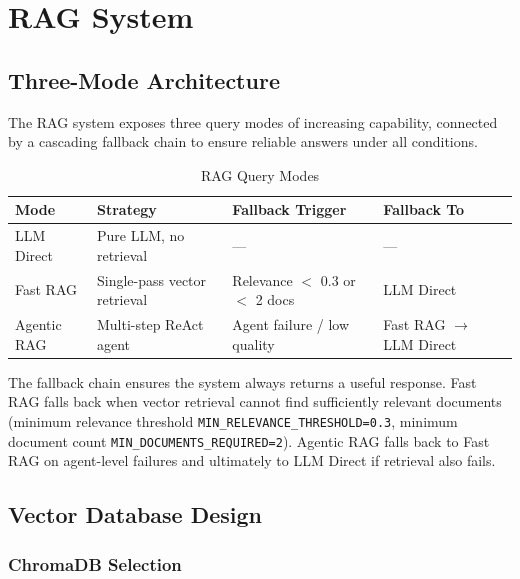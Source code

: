 \section{RAG System}
\label{sec:rag}

\subsection{Three-Mode Architecture}

The RAG system exposes three query modes of increasing capability, connected by a cascading fallback chain to ensure reliable answers under all conditions.

\begin{table}[H]
    \centering
    \caption{RAG Query Modes}
    \begin{tabular}{@{}p{2.5cm}p{4cm}p{4cm}p{2.5cm}@{}}
        \toprule
        \textbf{Mode} & \textbf{Strategy} & \textbf{Fallback Trigger} & \textbf{Fallback To} \\ \midrule
        LLM Direct   & Pure LLM, no retrieval          & ---                              & --- \\
        Fast RAG     & Single-pass vector retrieval    & Relevance $<$ 0.3 or $<$ 2 docs & LLM Direct \\
        Agentic RAG  & Multi-step ReAct agent          & Agent failure / low quality    & Fast RAG $\to$ LLM Direct \\ \bottomrule
    \end{tabular}
\end{table}

The fallback chain ensures the system always returns a useful response. Fast RAG falls back when vector retrieval cannot find sufficiently relevant documents (minimum relevance threshold \texttt{MIN\_\allowbreak RELEVANCE\_\allowbreak THRESHOLD=0.3}, minimum document count \texttt{MIN\_\allowbreak DOCUMENTS\_\allowbreak REQUIRED=2}). Agentic RAG falls back to Fast RAG on agent-level failures and ultimately to LLM Direct if retrieval also fails.

\subsection{Vector Database Design}

\subsubsection{ChromaDB Selection}

